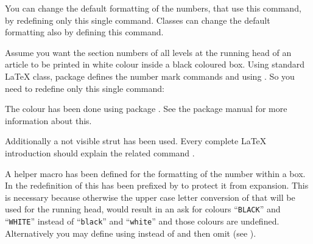   You can change the default formatting of the numbers, that use this command,
  by redefining only this single command. Classes can change the default
  formatting also by defining this command.%
    \begin{Example}
      Assume you want the section numbers of all levels at the running head of
      an article to be printed in white colour inside a black coloured
      box. Using standard \LaTeX{}  class, package
       defines the number mark commands
       and  using
      . So you need to redefine only this single
      command:
      The colour has been done using package
      . See the package manual for more
      information about this. 

      Additionally a not visible strut has been used. Every complete \LaTeX{}
      introduction should explain the related command .

      A helper macro  has been defined for the formatting of
      the number within a box. In the redefinition of
       this has been prefixed by  to
      protect it from expansion. This is necessary because otherwise the upper
      case letter conversion of  that will be used for
      the running head, would result in an ask for colours ``\texttt{BLACK}''
      and ``\texttt{WHITE}'' instead of ``\texttt{black}'' and
      ``\texttt{white}'' and those colours are undefined. Alternatively you
      may define  using  instead
      of  and then omit  (see
      \cite{latex:clsguide}).


\end{Example}
